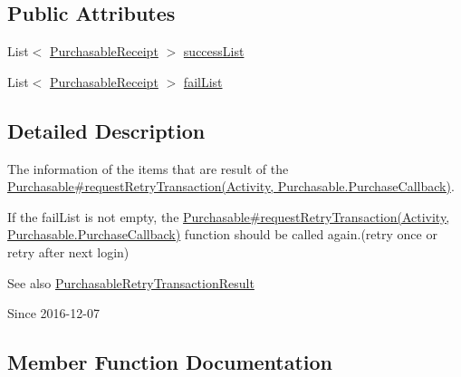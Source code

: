 \subsection*{Public Attributes}
\begin{DoxyCompactItemize}
\item 
List$<$ \hyperlink{classcom_1_1toast_1_1android_1_1gamebase_1_1base_1_1purchase_1_1_purchasable_receipt}{Purchasable\+Receipt} $>$ \hyperlink{classcom_1_1toast_1_1android_1_1gamebase_1_1base_1_1purchase_1_1_purchasable_retry_transaction_result_a94d9eecba2a24c99fd6c0a120803c18c}{success\+List}
\item 
List$<$ \hyperlink{classcom_1_1toast_1_1android_1_1gamebase_1_1base_1_1purchase_1_1_purchasable_receipt}{Purchasable\+Receipt} $>$ \hyperlink{classcom_1_1toast_1_1android_1_1gamebase_1_1base_1_1purchase_1_1_purchasable_retry_transaction_result_a4a6a726bab7d926265f330f4e67055b9}{fail\+List}
\end{DoxyCompactItemize}


\subsection{Detailed Description}
The information of the items that are result of the \hyperlink{}{Purchasable\#request\+Retry\+Transaction(\+Activity, Purchasable.\+Purchase\+Callback)}. 

If the fail\+List is not empty, the \hyperlink{}{Purchasable\#request\+Retry\+Transaction(\+Activity, Purchasable.\+Purchase\+Callback)} function should be called again.(retry once or retry after next login)

\begin{DoxySeeAlso}{See also}
\hyperlink{classcom_1_1toast_1_1android_1_1gamebase_1_1base_1_1purchase_1_1_purchasable_retry_transaction_result}{Purchasable\+Retry\+Transaction\+Result} 
\end{DoxySeeAlso}
\begin{DoxySince}{Since}
2016-\/12-\/07 
\end{DoxySince}


\subsection{Member Function Documentation}
\mbox{\label{classcom_1_1toast_1_1android_1_1gamebase_1_1base_1_1_value_object_ae6655c88c20a9a8406dc11b46250ac7b}} 
